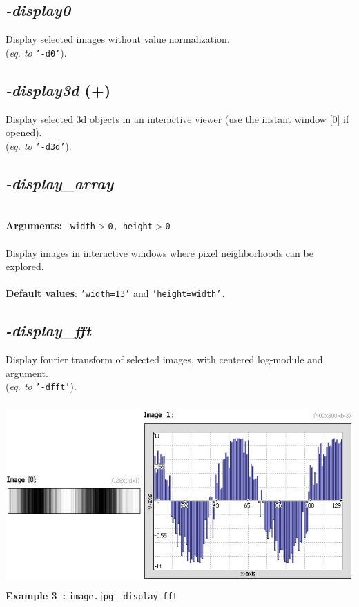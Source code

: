 \documentclass[a4paper,11pt,twoside]{book}
\begin{document}
\subsection{\emph{-display0} }\vspace*{-0.5em}
Display selected images without value normalization.
~\\(\emph{eq. to} {\small \texttt{'-d0'}}).


\subsection{\emph{-display3d} (+)}\vspace*{-0.5em}
Display selected 3d objects in an interactive viewer (use the instant window [0] if opened).
~\\(\emph{eq. to} {\small \texttt{'-d3d'}}).


\subsection{\emph{-display\_array} }\vspace*{-0.5em}
~\\\textbf{Arguments: } 
{\small \texttt{\_width$>$0,\_height$>$0}}\\~\\
Display images in interactive windows where pixel neighborhoods can be explored.
~\\~\\\textbf{Default values}: {\small \texttt{'width=13'} and \texttt{'height=width'.}}


\subsection{\emph{-display\_fft} }\vspace*{-0.5em}
Display fourier transform of selected images, with centered log-module and argument.
~\\(\emph{eq. to} {\small \texttt{'-dfft'}}).
\begin{center}\includegraphics[keepaspectratio=true,height=7cm,width=\textwidth]{img/gmic_def3.jpg}\\
{\footnotesize \textbf{Example 3~:} \texttt{image.jpg --display\_fft}}
\end{center}
\end{document}
